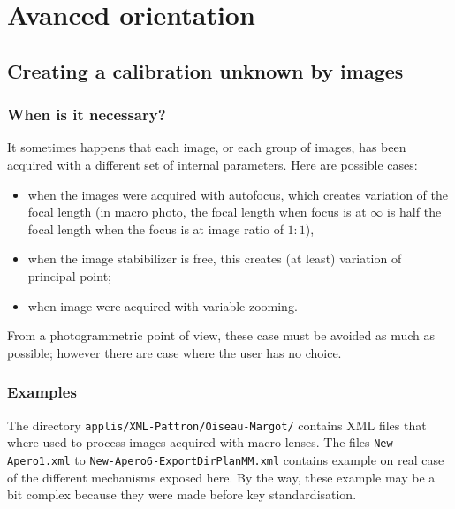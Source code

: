 \chapter{Avanced orientation}



\section{Creating a calibration unknown by images}

\subsection{When is it necessary?}

It sometimes happens that each image, or each group of images,
has been acquired with a different set of internal parameters. Here
are possible cases:

\begin{itemize}
    \item when the images were acquired with autofocus, which creates variation
          of the focal length (in macro photo, the focal length when focus is
          at $\infty$ is half the focal length when the focus is at image ratio of $1:1$),


    \item when  the image stabibilizer is free, this creates (at least)
          variation of principal point;

    \item when  image were acquired with variable  zooming.
\end{itemize}


From a photogrammetric point of view, these case must be avoided
as much as possible; however there are case where the user has no
choice.

\subsection{Examples}

The directory {\tt applis/XML-Pattron/Oiseau-Margot/} contains XML
files that where used to process images acquired with macro lenses.
The files {\tt New-Apero1.xml} to {\tt New-Apero6-ExportDirPlanMM.xml}
contains example on real case of the different mechanisms exposed
here. By the way, these example may be a bit complex because they
were made before key standardisation.

